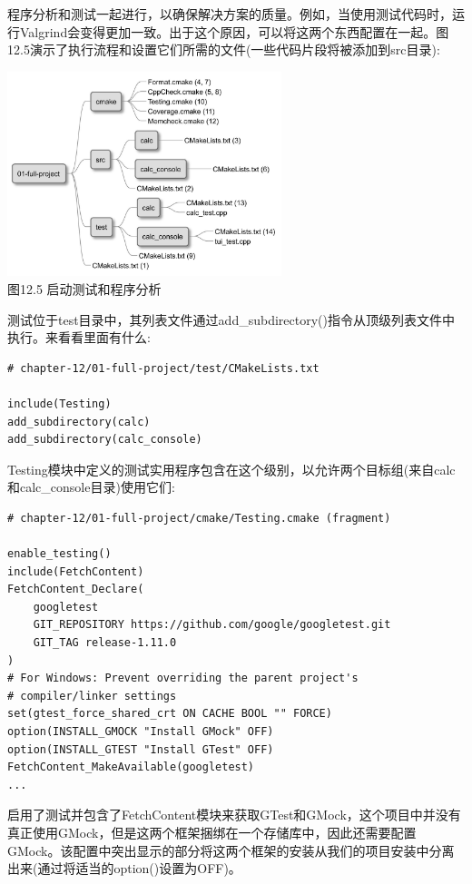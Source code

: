 

程序分析和测试一起进行，以确保解决方案的质量。例如，当使用测试代码时，运行Valgrind会变得更加一致。出于这个原因，可以将这两个东西配置在一起。图12.5演示了执行流程和设置它们所需的文件(一些代码片段将被添加到src目录):

\begin{center}
\includegraphics[width=0.6\textwidth]{content/3/chapter12/images/5.jpg}\\
图12.5 启动测试和程序分析
\end{center}

测试位于test目录中，其列表文件通过add\_subdirectory()指令从顶级列表文件中执行。来看看里面有什么:

\begin{lstlisting}[style=styleCMake]
# chapter-12/01-full-project/test/CMakeLists.txt

include(Testing)
add_subdirectory(calc)
add_subdirectory(calc_console)
\end{lstlisting}

Testing模块中定义的测试实用程序包含在这个级别，以允许两个目标组(来自calc和calc\_console目录)使用它们:

\begin{lstlisting}[style=styleCMake]
# chapter-12/01-full-project/cmake/Testing.cmake (fragment)

enable_testing()
include(FetchContent)
FetchContent_Declare(
	googletest
	GIT_REPOSITORY https://github.com/google/googletest.git
	GIT_TAG release-1.11.0
)
# For Windows: Prevent overriding the parent project's
# compiler/linker settings
set(gtest_force_shared_crt ON CACHE BOOL "" FORCE)
option(INSTALL_GMOCK "Install GMock" OFF)
option(INSTALL_GTEST "Install GTest" OFF)
FetchContent_MakeAvailable(googletest)
...
\end{lstlisting}

启用了测试并包含了FetchContent模块来获取GTest和GMock，这个项目中并没有真正使用GMock，但是这两个框架捆绑在一个存储库中，因此还需要配置GMock。该配置中突出显示的部分将这两个框架的安装从我们的项目安装中分离出来(通过将适当的option()设置为OFF)。

